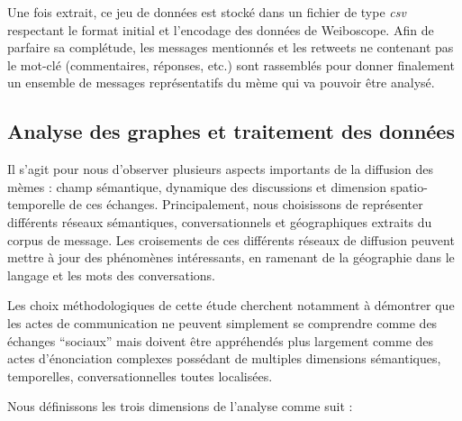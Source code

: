     Une fois extrait, ce jeu de données est stocké dans un fichier de type  \textit{csv} respectant le format initial et l'encodage des données de Weiboscope. Afin de parfaire sa complétude, les messages mentionnés et les retweets ne contenant pas le mot-clé (commentaires, réponses, etc.) sont rassemblés pour donner finalement un ensemble de messages représentatifs du mème qui va pouvoir être analysé.


\subsection[Analyse des graphes et traitement des données]{Analyse des graphes et traitement des données}

    Il s'agit pour nous d'observer plusieurs aspects importants de la diffusion des mèmes : champ sémantique, dynamique des discussions et dimension spatio-temporelle de ces échanges. Principalement, nous choisissons de représenter différents réseaux sémantiques, conversationnels et géographiques extraits du corpus de message. Les croisements de ces différents réseaux de diffusion peuvent mettre à jour des phénomènes intéressants, en ramenant de la géographie dans le langage et les mots des conversations.

    Les choix méthodologiques de cette étude cherchent notamment à démontrer que les actes de communication ne peuvent simplement se comprendre comme des échanges {\textquotedblleft}sociaux{\textquotedblright} mais doivent être appréhendés plus largement comme des actes d{\textquoteright}énonciation complexes possédant de multiples dimensions sémantiques, temporelles, conversationnelles toutes localisées.

    Nous définissons les trois dimensions de l'analyse comme suit :


